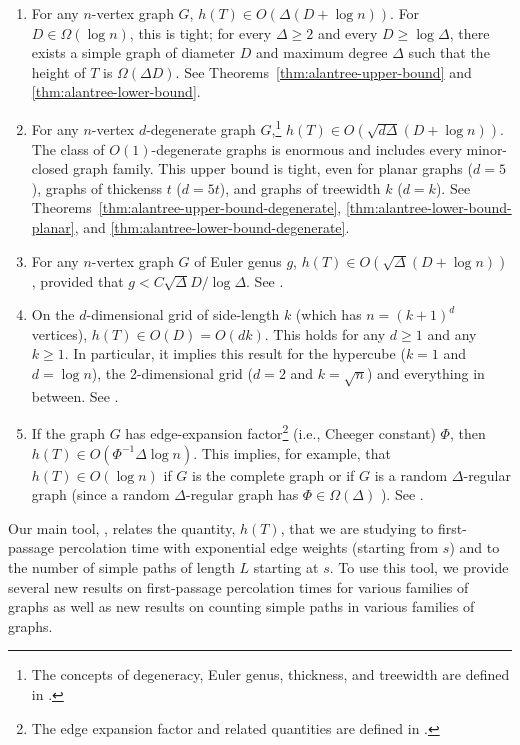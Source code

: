 \documentclass{patmorin}
\begin{document}
\begin{enumerate}
  \item For any $n$-vertex graph $G$, $h(T)\in O(\Delta(D+\log n))$.
  For $D\in \Omega(\log n)$, this is tight; for every $\Delta\ge
  2$ and every $D \ge \log\Delta$, there exists a simple graph of
  diameter $D$ and maximum degree $\Delta$ such that the height of $T$
  is $\Omega(\Delta D)$.  See Theorems~\ref{thm:alantree-upper-bound}
  and \ref{thm:alantree-lower-bound}.

  \item For any $n$-vertex $d$-degenerate graph $G$,\footnote{The
  concepts of degeneracy, Euler genus, thickness, and treewidth
  are defined in .} $h(T)\in
  O(\sqrt{d\Delta}(D+\log n))$.  The class of $O(1)$-degenerate
  graphs is enormous and includes every minor-closed graph family.
  This upper bound is tight, even for planar graphs ($d=5$), graphs
  of thickenss $t$ ($d=5t$), and graphs of treewidth $k$ ($d=k$).
  See Theorems~\ref{thm:alantree-upper-bound-degenerate},
  \ref{thm:alantree-lower-bound-planar}, and
  \ref{thm:alantree-lower-bound-degenerate}.

  \item For any $n$-vertex graph $G$ of Euler genus $g$,
  $h(T)\in O(\sqrt{\Delta}(D+\log n))$, provided that $g <
  C\sqrt{\Delta}D/\log\Delta$.  See .

  \item On the $d$-dimensional grid of side-length $k$ (which has
  $n=(k+1)^d$ vertices), $h(T)\in O(D)=O(dk)$. This holds for any
  $d\ge 1$ and any $k\ge 1$.  In particular, it implies this result
  for the hypercube ($k=1$ and $d=\log n$), the 2-dimensional
  grid ($d=2$ and $k=\sqrt{n}$) and everything in between.
  See .

  \item If the graph $G$ has edge-expansion factor\footnote{The
  edge expansion factor and related quantities are defined in
  .} (i.e., Cheeger constant) $\Phi$, then
  $h(T)\in O(\Phi^{-1}\Delta\log n)$.  This implies, for example,
  that $h(T)\in O(\log n)$ if $G$ is the complete graph or if $G$ is
  a random $\Delta$-regular graph (since a random $\Delta$-regular
  graph has $\Phi\in \Omega(\Delta)$ \cite{bollobas:isoperimetric}).
  See .
\end{enumerate}

Our main tool, , relates the quantity, $h(T)$, that
we are studying to first-passage percolation time with exponential edge
weights (starting from $s$) and to the number of simple paths of length
$L$ starting at $s$.  To use this tool, we provide several new results
on first-passage percolation times for various families of graphs as well
as new results on counting simple paths in various families of graphs.
\end{document}
